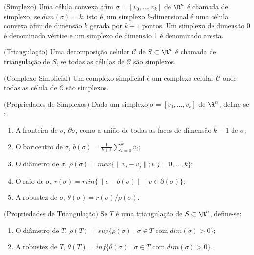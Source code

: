 \begin{defi} $($Simplexo$)$
Uma c\'elula convexa afim 
$\sigma = [v_{0},\ldots,v_{k}]$ de $\R^{n}$ \'e chamada de simplexo, se 
$dim(\sigma) = k$, isto \'e, um simplexo $k$-dimensional \'e uma c\'elula 
convexa afim de dimens\~ao $k$ gerada por $k+1$ pontos. 
Um simplexo de dimensão 0 é denominado vértice e um simplexo de dimensão 1 é denominado aresta.
\end{defi}

\begin{defi} $($Triangulação$)$
Uma decomposi\c c\~ao celular $\mathcal{C}$ de 
$S \subset \R^{n}$ \'e chamada de triangula\c c\~ao de $S$, se
todas as c\'elulas de $\mathcal{C}$ s\~ao simplexos. 
\end{defi}

\begin{defi} $($Complexo Simplicial$)$
Um complexo simplicial é um complexo celular $\mathcal{C}$ onde todas as célula de $\mathcal{C}$ são simplexos.
\end{defi}

\begin{defi} $($Propriedades de Simplexos$)$
Dado um simplexo 
$\sigma = [v_{0}, \ldots, v_{k}]$ de $\R^{n}$, define-se : 
\begin{enumerate} 
\item A fronteira de $\sigma$, $\partial \sigma$, como a uni\~ao de todas as
      faces de dimens\~ao $k-1$ de $\sigma$; 
\item O baricentro de $\sigma$, $b(\sigma) = \frac{1}{k+1} \sum_{i=0}^{k}
      v_{i}$; 
\item O di\^ametro de $\sigma$, $\rho(\sigma) = max \{\parallel v_{i}-v_{j} 
\parallel; i, j = 0, \ldots, k\}$;
\item O raio de $\sigma$, $r(\sigma) = min \{\parallel v-b(\sigma) \parallel \; | \;
       v \in \partial(\sigma)\}$;
\item A robustez de $\sigma$, $\theta(\sigma) = r(\sigma)/\rho(\sigma)$.
\end{enumerate} 
\end{defi}

\begin{defi} $($Propriedades de Triangulação$)$
Se $T$ \'e uma triangula\c c\~ao de 
$S \subset \R^{n}$, define-se: 
\begin{enumerate} 
\item O di\^ametro de $T$, $\rho(T) = sup \{ \rho(\sigma) \; | \; \sigma \in T$ 
      com $dim(\sigma) > 0 \}$;
\item A robustez de $T$, $\theta(T) = inf \{ \theta(\sigma) \; | \; \sigma \in T$ 
      com $dim(\sigma) > 0 \}$.
\end{enumerate} 
\end{defi}

